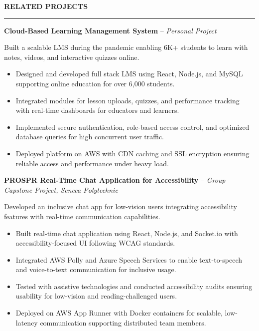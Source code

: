 \documentclass[10pt,letterpaper]{article}
\begin{document}
\vspace{6pt}

\textbf{RELATED PROJECTS}\\[-8pt]
\noindent\rule{\textwidth}{1pt}

\vspace{-2pt}

\textbf{Cloud-Based Learning Management System} -- \emph{Personal Project}

\vspace{-1pt}

Built a scalable LMS during the pandemic enabling 6K+ students to learn with notes, videos, and interactive quizzes online.
\vspace{-1pt}
\begin{itemize}
\item Designed and developed full stack LMS using React, Node.js, and MySQL supporting online education for over 6,000 students.
\item Integrated modules for lesson uploads, quizzes, and performance tracking with real-time dashboards for educators and learners.
\item Implemented secure authentication, role-based access control, and optimized database queries for high concurrent user traffic.
\item Deployed platform on AWS with CDN caching and SSL encryption ensuring reliable access and performance under heavy load.
\end{itemize}

\textbf{PROSPR  Real-Time Chat Application for Accessibility} -- \emph{Group Capstone Project, Seneca Polytechnic}

\vspace{-1pt}

Developed an inclusive chat app for low-vision users integrating accessibility features with real-time communication capabilities.
\vspace{-1pt}
\begin{itemize}
\item Built real-time chat application using React, Node.js, and Socket.io with accessibility-focused UI following WCAG standards.
\item Integrated AWS Polly and Azure Speech Services to enable text-to-speech and voice-to-text communication for inclusive usage.
\item Tested with assistive technologies and conducted accessibility audits ensuring usability for low-vision and reading-challenged users.
\item Deployed on AWS App Runner with Docker containers for scalable, low-latency communication supporting distributed team members.
\end{itemize}
\end{document}
